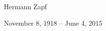 \documentclass{scrartcl}
\begin{document}
\begin{titlepage}
	\setlength{\parindent}{0pt}
	\vspace*{6cm}
	\raggedleft
	{\color{gray!80}\Huge Hermann Zapf}\par
	\vspace{1cm}
	{\color{gray!90}\scriptsize November 8, 1918 -- June 4, 2015}
\end{titlepage}
\end{document}
